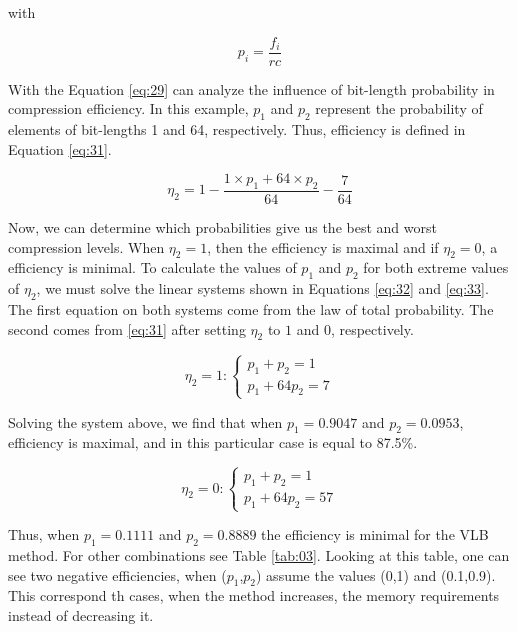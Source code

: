 \documentclass[10pt]{article}
\begin{document}
\noindent with

\begin{equation}\label{eq:30}
 p_i = \frac{f_i}{rc}
\end{equation}

With the Equation \ref{eq:29} can analyze the influence of bit-length 
probability in compression efficiency. In this example, $p_1$ and $p_2$ 
represent the probability of elements of bit-lengths 1 and 64, respectively. 
Thus, efficiency is defined in Equation \ref{eq:31}. 

\begin{equation}\label{eq:31}
 \eta_2 = 1 - \frac{1 \times p_1  + 64 \times p_2}{64} - \frac{7}{64} 
\end{equation}

Now, we can determine which probabilities give us the best and worst compression 
levels. When $\eta_2=1$, then the efficiency is maximal and if $\eta_2=0$, a 
efficiency is minimal. To calculate the values ​​of $p_1$ and $p_2$ for both 
extreme values of $\eta_2$,  we must solve the linear systems shown in Equations 
\ref{eq:32} and \ref{eq:33}. The first equation on both systems come from the 
law of total probability. The second comes from \ref{eq:31} after setting 
$\eta_2$ to $1$ and $0$, respectively. 

\begin{equation}\label{eq:32}
  \eta_2 = 1 :\left
  \{\begin{matrix}
    p_1 + p_2 = 1\\ 
    p_1+64p_2 = 7
  \end{matrix}
  \right.
\end{equation}

Solving the system above, we find that  when $p_1=0.9047$ and $p_2=0.0953$, 
efficiency is maximal, and in this particular case is equal to 87.5\%.

\begin{equation}\label{eq:33}
  \eta_2 = 0 :\left
  \{\begin{matrix}
    p_1 + p_2 = 1\\ 
    p_1+64p_2 = 57
  \end{matrix}
  \right.
\end{equation}

Thus, when $p_1=0.1111$ and $p_2=0.8889$ the efficiency is minimal for the VLB 
method. For other combinations see Table \ref{tab:03}. Looking at this table, 
one can see two negative efficiencies, when ($p_1$,$p_2$) assume the values 
​​(0,1) and (0.1,0.9). This correspond th cases, when the method increases, the 
memory requirements instead of decreasing it.
\end{document}

